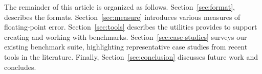 \documentclass[main.tex]{subfiles}
\begin{document}
The remainder of this article is organized as follows.
Section~\ref{sec:format}, describes the \name formats.
Section~\ref{sec:measure} introduces various measures of floating-point
error.  Section~\ref{sec:tools} describes the utilities \name provides to
support creating and working with benchmarks.
Section~\ref{sec:case-studies} surveys our existing benchmark suite,
highlighting representative case studies from recent tools in the
literature.  Finally, Section~\ref{sec:conclusion} discusses future work
and concludes.


\end{document}
